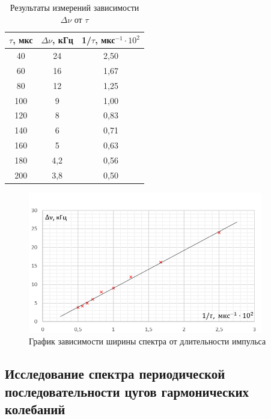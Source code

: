 \documentclass[a4paper]{article}
\theoremstyle{definition}
\theoremstyle{remark}
\begin{document}
\begin{table}[h!]
    \centering
    \begin{tabular}{|c|c|c|}
    \hline
    $\tau$, мкс & $\Delta\nu$, кГц & 1/$\tau$, мкс$^{-1} \cdot 10^2$ \\ \hline
    40          & 24                & 2,50                            \\ \hline
    60          & 16                & 1,67                            \\ \hline
    80          & 12                & 1,25                            \\ \hline
    100         & 9                 & 1,00                            \\ \hline
    120         & 8                 & 0,83                            \\ \hline
    140         & 6                 & 0,71                            \\ \hline
    160         & 5                 & 0,63                            \\ \hline
    180         & 4,2               & 0,56                            \\ \hline
    200         & 3,8               & 0,50                            \\ \hline
    \end{tabular}
    \caption{Результаты измерений зависимости $\Delta\nu$ от $\tau$}
    \end{table}

    \begin{figure}[h!]
        \centering
        \includegraphics[width = 290pt]{image/graph1.png}
        \caption{График зависимости ширины спектра от длительности импульса}
    \end{figure}


\newpage

\subsection{Исследование спектра периодической последовательности цугов гармонических колебаний}
\end{document}
